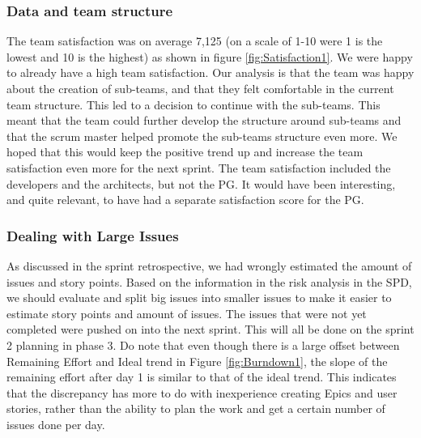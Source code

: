 \documentclass{article}
\begin{document}
\subsubsection{Data and team structure}

The team satisfaction was on average 7,125 (on a scale of 1-10 were 1 is the lowest and 10 is the highest) as shown in figure \ref{fig:Satisfaction1}. We were happy to already have a high team satisfaction. Our analysis is that the team was happy about the creation of sub-teams, and that they felt comfortable in the current team structure. This led to a decision to continue with the sub-teams. This meant that the team could further develop the structure around sub-teams and that the scrum master helped promote the sub-teams structure even more. We hoped that this would keep the positive trend up and increase the team satisfaction even more for the next sprint. The team satisfaction included the developers and the architects, but not the PG. It would have been interesting, and quite relevant, to have had a separate satisfaction score for the PG.

\subsubsection{Dealing with Large Issues}
As discussed in the sprint retrospective, we had wrongly estimated the amount of issues and story points. Based on the information in the risk analysis in the SPD, we should evaluate and split big issues into smaller issues to make it easier to estimate story points and amount of issues. The issues that were not yet completed were pushed on into the next sprint. This will all be done on the sprint 2 planning in phase 3.  Do note that even though there is a large offset between Remaining Effort and Ideal trend in Figure \ref{fig:Burndown1}, the slope of the remaining effort after day 1 is similar to that of the ideal trend. This indicates that the discrepancy has more to do with inexperience creating Epics and user stories, rather than the ability to plan the work and get a certain number of issues done per day.
\end{document}
